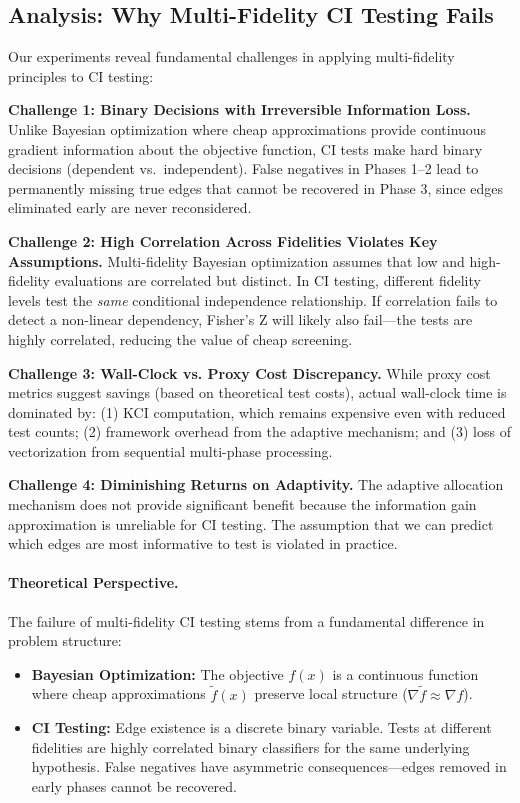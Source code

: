 \documentclass{article}
\begin{document}
\subsection{Analysis: Why Multi-Fidelity CI Testing Fails}

Our experiments reveal fundamental challenges in applying multi-fidelity principles to CI testing:

\textbf{Challenge 1: Binary Decisions with Irreversible Information Loss.} Unlike Bayesian optimization where cheap approximations provide continuous gradient information about the objective function, CI tests make hard binary decisions (dependent vs.~independent). False negatives in Phases 1--2 lead to permanently missing true edges that cannot be recovered in Phase 3, since edges eliminated early are never reconsidered.

\textbf{Challenge 2: High Correlation Across Fidelities Violates Key Assumptions.} Multi-fidelity Bayesian optimization assumes that low and high-fidelity evaluations are correlated but distinct. In CI testing, different fidelity levels test the \textit{same} conditional independence relationship. If correlation fails to detect a non-linear dependency, Fisher's Z will likely also fail---the tests are highly correlated, reducing the value of cheap screening.

\textbf{Challenge 3: Wall-Clock vs. Proxy Cost Discrepancy.} While proxy cost metrics suggest savings (based on theoretical test costs), actual wall-clock time is dominated by: (1) KCI computation, which remains expensive even with reduced test counts; (2) framework overhead from the adaptive mechanism; and (3) loss of vectorization from sequential multi-phase processing.

\textbf{Challenge 4: Diminishing Returns on Adaptivity.} The adaptive allocation mechanism does not provide significant benefit because the information gain approximation is unreliable for CI testing. The assumption that we can predict which edges are most informative to test is violated in practice.

\paragraph{Theoretical Perspective.} The failure of multi-fidelity CI testing stems from a fundamental difference in problem structure:

\begin{itemize}
    \item \textbf{Bayesian Optimization:} The objective $f(x)$ is a continuous function where cheap approximations $\tilde{f}(x)$ preserve local structure ($\nabla \tilde{f} \approx \nabla f$).
    \item \textbf{CI Testing:} Edge existence is a discrete binary variable. Tests at different fidelities are highly correlated binary classifiers for the same underlying hypothesis. False negatives have asymmetric consequences---edges removed in early phases cannot be recovered.
\end{itemize}
\end{document}
